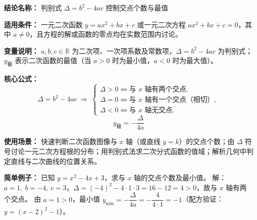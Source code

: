 \textbf{结论名称：} 判别式 \(\Delta = b^2-4ac\) 控制交点个数与最值

\textbf{适用条件：} 一元二次函数 \(y=ax^2+bx+c\) 或一元二次方程 \(ax^2+bx+c=0\)，其中 \(a \neq 0\)，且方程的解或函数的零点均在实数范围内讨论。

\textbf{变量说明：} \(a,b,c\in\mathbb{R}\) 为二次项、一次项系数及常数项，\(\Delta = b^2 - 4ac\) 为判别式；\(y_{\text{极}}\) 表示二次函数的最值（当 \(a>0\) 时为最小值，\(a<0\) 时为最大值）。

\textbf{核心公式：}
\[
\boxed{\Delta = b^2-4ac\ \Longrightarrow\ 
\begin{cases}
\Delta > 0 \iff \text{与 }x\text{ 轴有两个交点},\\[2pt]
\Delta = 0 \iff \text{与 }x\text{ 轴有一个交点（相切）},\\[2pt]
\Delta < 0 \iff \text{与 }x\text{ 轴无交点}.
\end{cases}}
\]
\[
\boxed{y_{\text{极}} = -\dfrac{\Delta}{4a}}
\]

\textbf{使用场景：} 快速判断二次函数图像与 \(x\) 轴（或直线 \(y=k\)）的交点个数；由 \(\Delta\) 符号讨论一元二次方程根的分布；用判别式法求二次分式函数的值域；解析几何中判定直线与二次曲线的位置关系。

\textbf{简单例子：} 已知 \(y = x^2 - 4x + 3\)，求与 \(x\) 轴的交点个数及最小值。  
解：\(a=1,\ b=-4,\ c=3\)，\(\Delta = (-4)^2 - 4\cdot1\cdot3 = 16-12=4>0\)，故与 \(x\) 轴有两个交点。  
由 \(a=1>0\)，最小值 \(y_{\min} = -\dfrac{\Delta}{4a} = -\dfrac{4}{4\cdot1} = -1\)（配方验证：\(y=(x-2)^2-1\)）。